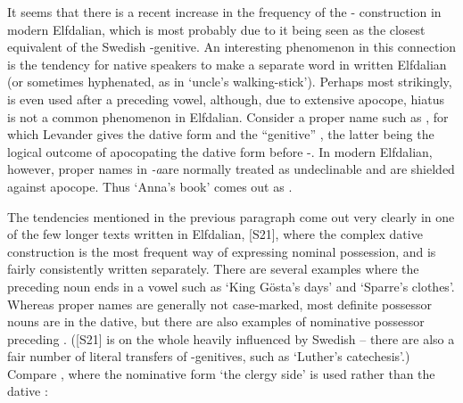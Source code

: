
It seems that there is a recent increase in the frequency of the \nobreakdash- construction in modern Elfdalian, which is most probably due to it being seen as the closest equivalent of the Swedish -genitive. An interesting phenomenon in this connection is the tendency for native speakers to make  a separate word in written Elfdalian (or sometimes hyphenated, as in  ‘uncle’s walking-stick’). Perhaps most strikingly,  is even used after a preceding vowel, although, due to extensive apocope, hiatus is not a common phenomenon in Elfdalian. Consider a proper name such as , for which Levander gives the dative form  and the “genitive” , the latter being the logical outcome of apocopating the dative form before {}-. In modern Elfdalian, however, proper names in\textit{ {}-a}\textstyleLinguisticExample{ }are normally treated as undeclinable and are shielded against apocope. Thus ‘Anna’s book’ comes out as . 

The tendencies mentioned in the previous paragraph come out very clearly in one of the few longer texts written in Elfdalian, [S21], where the complex dative construction is the most frequent way of expressing nominal possession, and  is fairly consistently written separately. There are several examples where the preceding noun ends in a vowel such as  ‘King Gösta’s days’ and  ‘Sparre’s clothes’. Whereas proper names are generally not case-marked, most definite possessor nouns are in the dative, but there are also examples of nominative possessor preceding . ([S21] is on the whole heavily influenced by Swedish – there are also a fair number of literal transfers of -genitives, such as ‘Luther’s catechesis’.) Compare , where the nominative form  ‘the clergy side’ is used rather than the dative :

